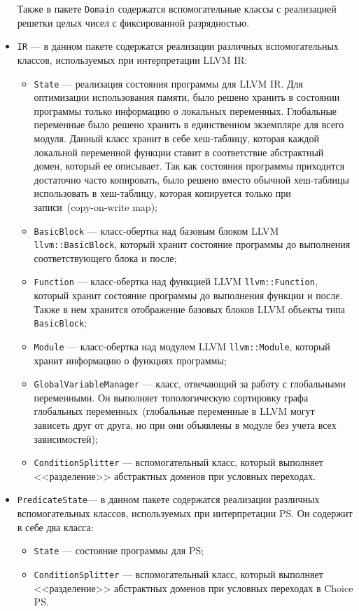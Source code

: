 \begin{itemize}
    Также в пакете \texttt{Domain} содержатся вспомогательные классы с 
    реализацией решетки целых чисел с фиксированной разрядностью.

\item \texttt{IR} --- в данном пакете содержатся реализации различных 
вспомогательных классов, используемых при интерпретации LLVM IR:
    \begin{itemize}
    \item \texttt{State} --- реализация состояния программы для LLVM IR. Для 
    оптимизации использования памяти, было решено хранить в состоянии 
    программы только информацию о локальных переменных. Глобальные переменные 
    было решено хранить в единственном экземпляре для всего модуля. Данный 
    класс хранит в себе хеш-таблицу, которая каждой локальной переменной 
    функции ставит в соответствие абстрактный домен, который ее описывает. Так 
    как состояния программы приходится достаточно часто копировать, было решено 
    вместо обычной хеш-таблицы использовать в хеш-таблицу, которая копируется 
    только при записи~(copy-on-write map);
    \item \texttt{BasicBlock} --- класс-обертка над базовым блоком LLVM
    \texttt{llvm::BasicBlock}, который хранит состояние программы до
    выполнения соответствующего блока и после;
    \item \texttt{Function} --- класс-обертка над функцией LLVM
    \texttt{llvm::Function}, который хранит состояние программы до 
    выполнения функции и после. Также в нем хранится отображение базовых блоков
    LLVM объекты типа \texttt{BasicBlock};
    \item \texttt{Module} --- класс-обертка над модулем LLVM
    \texttt{llvm::Module}, который хранит информацию о функциях 
    программы;
    \item \texttt{GlobalVariableManager} --- класс, отвечающий за работу с 
    глобальными переменными. Он выполняет топологическую сортировку графа
    глобальных переменных~(глобальные переменные в LLVM могут зависеть друг от
    друга, но при они объявлены в модуле без учета всех зависимостей);
    \item \texttt{ConditionSplitter} --- вспомогательный класс, который 
    выполняет <<разделение>> абстрактных доменов при условных переходах.
    \end{itemize}
\item \texttt{PredicateState}--- в данном пакете содержатся реализации 
различных вспомогательных классов, используемых при интерпретации PS. Он 
содержит в себе два класса:
    \begin{itemize}
    \item \texttt{State} --- состояние программы для PS;
    \item \texttt{ConditionSplitter} --- вспомогательный класс, который 
    выполняет <<разделение>> абстрактных доменов при условных переходах в 
    Choice PS.
    \end{itemize}
\end{itemize}

